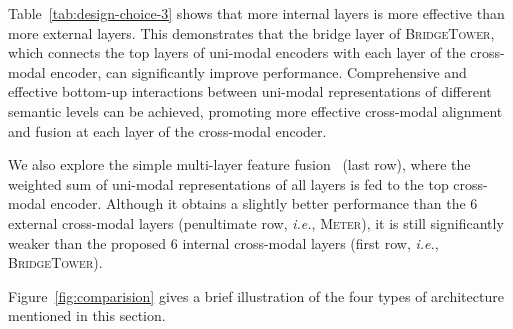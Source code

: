 \documentclass[letterpaper]{article} %
\newcommand{\tablestyle}[2]{\setlength{\tabcolsep}{#1}\renewcommand{\arraystretch}{#2}\centering\footnotesize}
\newcommand{\methodname}[0]{\textsc{BridgeTower}}
\newcommand{\metername}[0]{\textsc{Meter}}
\newcommand{\ie}[0]{\textit{i.e.},}
\begin{document}
Table~\ref{tab:design-choice-3} shows that more {internal} layers is more effective than more {external} layers.
This demonstrates that the bridge layer of \methodname{}, which connects the top layers of uni-modal encoders with each layer of the cross-modal encoder, can significantly improve performance. 
Comprehensive and effective bottom-up interactions between uni-modal representations of different semantic levels can be achieved, promoting more effective cross-modal alignment and fusion at each layer of the cross-modal encoder.

We also explore the simple multi-layer feature fusion~\citep{dou2021meter} (last row), where the weighted sum of uni-modal representations of all layers is fed to the top cross-modal encoder. 
Although it obtains a slightly better performance than the $6$ {external} cross-modal layers (penultimate row, \ie{} \metername{}), it is still significantly weaker than the proposed $6$ {internal} cross-modal layers (first row, \ie{} \methodname{}).

Figure~\ref{fig:comparision} gives a brief illustration of the four types of architecture mentioned in this section.

\begin{table}[!t]
  \tablestyle{5pt}{1.0}
  \caption{
    Experiments with different number of {internal} and {external} cross-modal layers.~* denotes simple multi-layer feature fusion. Each type corresponds to a subfigure of the same name in Figure~\ref{fig:comparision}. RSUM indicates the sum of recall metrics for image-text retrieval.
  }
  \label{tab:design-choice-3}
\end{table}
\end{document}
